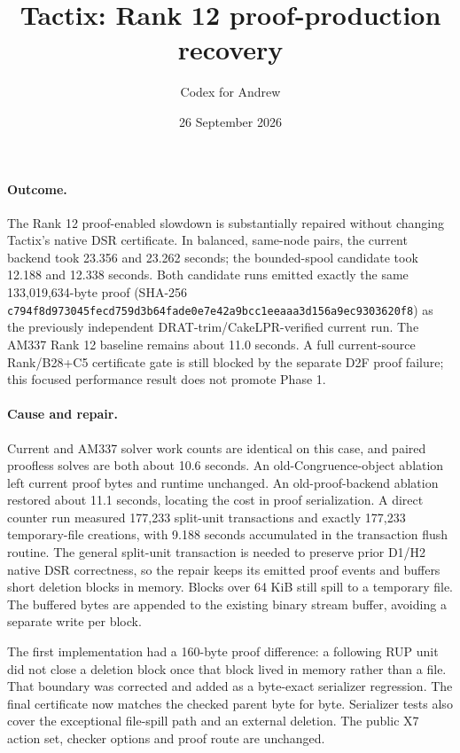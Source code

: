 \documentclass[11pt]{article}
\title{Tactix: Rank 12 proof-production recovery}
\author{Codex for Andrew}
\date{26 September 2026}
\begin{document}
\maketitle

\paragraph{Outcome.}
The Rank 12 proof-enabled slowdown is substantially repaired without changing
Tactix's native DSR certificate. In balanced, same-node pairs, the current
backend took 23.356 and 23.262 seconds; the bounded-spool candidate took
12.188 and 12.338 seconds. Both candidate runs emitted exactly the same
133,019,634-byte proof (SHA-256 \texttt{c794f8d973045fecd759d3b64fade0e7e42a9bcc1eeaaa3d156a9ec9303620f8})
as the previously independent DRAT-trim/CakeLPR-verified current run. The
AM337 Rank 12 baseline remains about 11.0 seconds. A full current-source
Rank/B28+C5 certificate gate is still blocked by the separate D2F proof
failure; this focused performance result does not promote Phase 1.

\paragraph{Cause and repair.}
Current and AM337 solver work counts are identical on this case, and paired
proofless solves are both about 10.6 seconds. An old-Congruence-object
ablation left current proof bytes and runtime unchanged. An old-proof-backend
ablation restored about 11.1 seconds, locating the cost in proof serialization.
A direct counter run measured 177,233 split-unit transactions and exactly
177,233 temporary-file creations, with 9.188 seconds accumulated in the
transaction flush routine. The general split-unit transaction is needed to
preserve prior D1/H2 native DSR correctness, so the repair keeps its emitted
proof events and buffers short deletion blocks in memory. Blocks over 64 KiB
still spill to a temporary file. The buffered bytes are appended to the
existing binary stream buffer, avoiding a separate write per block.

The first implementation had a 160-byte proof difference: a following RUP
unit did not close a deletion block once that block lived in memory rather
than a file. That boundary was corrected and added as a byte-exact serializer
regression. The final certificate now matches the checked parent byte for
byte. Serializer tests also cover the exceptional file-spill path and an
external deletion. The public X7 action set, checker options and proof route
are unchanged.
\end{document}
